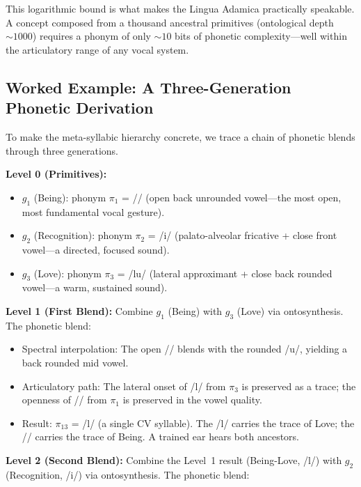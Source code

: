 \documentclass[12pt, letterpaper]{book}
\def\mathfrak#1{#1}%
\begin{document}
This logarithmic bound is what makes the Lingua Adamica practically speakable. A concept composed from a thousand ancestral primitives (ontological depth $\sim 1000$) requires a phonym of only $\sim 10$ bits of phonetic complexity---well within the articulatory range of any vocal system.


\subsection{Worked Example: A Three-Generation Phonetic Derivation}

To make the meta-syllabic hierarchy concrete, we trace a chain of phonetic blends through three generations.

\noindent\textbf{Level 0 (Primitives):}
\begin{itemize}
    \item $\mathfrak{g}_1$ (Being): phonym $\pi_1$ = /\textscripta/ (open back unrounded vowel---the most open, most fundamental vocal gesture).
    \item $\mathfrak{g}_2$ (Recognition): phonym $\pi_2$ = /\textesh i/ (palato-alveolar fricative + close front vowel---a directed, focused sound).
    \item $\mathfrak{g}_3$ (Love): phonym $\pi_3$ = /lu/ (lateral approximant + close back rounded vowel---a warm, sustained sound).
\end{itemize}

\noindent\textbf{Level 1 (First Blend):} Combine $\mathfrak{g}_1$ (Being) with $\mathfrak{g}_3$ (Love) via ontosynthesis. The phonetic blend:

\begin{itemize}
    \item Spectral interpolation: The open /\textscripta/ blends with the rounded /u/, yielding a back rounded mid vowel.
    \item Articulatory path: The lateral onset of /l/ from $\pi_3$ is preserved as a trace; the openness of /\textscripta/ from $\pi_1$ is preserved in the vowel quality.
    \item Result: $\pi_{13}$ = /l\textscripta/ (a single CV syllable). The /l/ carries the trace of Love; the /\textscripta/ carries the trace of Being. A trained ear hears both ancestors.
\end{itemize}

\noindent\textbf{Level 2 (Second Blend):} Combine the Level~1 result (Being-Love, /l\textscripta/) with $\mathfrak{g}_2$ (Recognition, /\textesh i/) via ontosynthesis. The phonetic blend:
\end{document}
